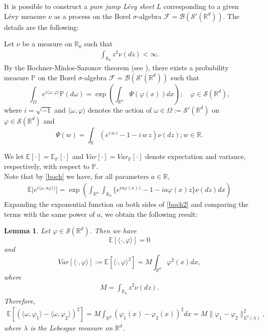 \documentclass[12pt]{article}%
\newtheorem{lemma}[theorem]{Lemma}
\newcommand{\E}{E}
\numberwithin{equation}{section}
\def\cF{{\mathcal {F}}}
\def\cB{{\mathcal{B}}}
\def\P{\mathbb{P}}
\def\R{\mathbb{R}}
\def\S{\mathcal{S}}
\def\E{\mathbb{E}}
\begin{document}
It is possible to construct a \emph{pure jump L\'{e}vy sheet} $L$ corresponding to a given  L\'{e}vy measure $\nu$  
as a process on the Borel $\sigma$-algebra $\cF = \cB(\S'(\R^d))$. The details are the following:


Let $\nu$ be a measure on $\R_0$ such that
\begin{align}
\int_{\R_0} z^2 \nu(dz) < \infty.
\end{align}
By the Bochner-Minlos-Sazonov theorem (see \cite{GV}), there exists a probability measure $\P$ on the Borel $\sigma$-algebra $\cF = \cB(\S'(\R^d))$ such that
\begin{equation}
\int_\Omega e^{i\langle\omega,\varphi \rangle}\P(d\omega)=\exp\left(\int_{\R^n}\Psi(\varphi(x))dx\right);
\quad \varphi\in\mathcal{S}(\R^d), \label{boch}
\end{equation}
where $i=\sqrt{-1}$ and $\langle\omega,\varphi\rangle$ denotes the action of $\omega\in \Omega:=\mathcal{S}'(\R^d)$ on $\varphi\in \mathcal{S}(\R^d)$ and 
\begin{equation}
\Psi(w)=\int_{\R}\left(e^{i\,w\,z}-1-i\,w\,z\right)\nu(dz); w \in \R.
\end{equation}

We let $\E[\cdot]=\E_{\P}[\cdot]$ and $Var[\cdot]=Var_{\P}[\cdot]$ denote expectation and variance, respectively, with respect to $\P$.\\
Note that by \eqref{boch} we have, for all parameters $a \in \R$,
\begin{align}
    \E| e^{i\langle \omega,a \varphi \rangle)}]=\exp\left(\int_{\R^n}\int_{\R_0} \{ e^{i a \varphi(x)z} - 1 - i a \varphi(x)z\} \nu(dz) dx \right) \label{boch2}
\end{align}
Expanding the exponential function on both sides of \eqref{boch2} and comparing the terms with the same power of $a$, we obtain the following result:
\begin{lemma}
\label{2.5}
Let $\varphi\in\mathcal{S}(\R^d)$. 
Then we have
\begin{equation}
\E[\langle\cdot,\varphi\rangle]=0
\end{equation}
and
\begin{equation}
Var[\langle\cdot,\varphi \rangle]:=\E[\langle\cdot,\varphi\rangle^2] = M \int_{\R^d} \varphi^2(x)dx, \label{Var}
\end{equation}
where
\begin{align}
    M=\int_{\R_0} z^2 \nu(dz).
\end{align}
Therefore,
\begin{align}
    \E[(\langle \omega,\varphi_1\rangle - \langle\omega,\varphi_2\rangle)^2]=M \int_{\R^d} (\varphi_1(x)-\varphi_2(x))^2 dx=M \| \varphi_1 - \varphi_2 \|^2_{L^2(\lambda)}, 
\end{align}
where $\lambda$ is the Lebesgue measure on $\R^d$.

\end{lemma}
\end{document}
